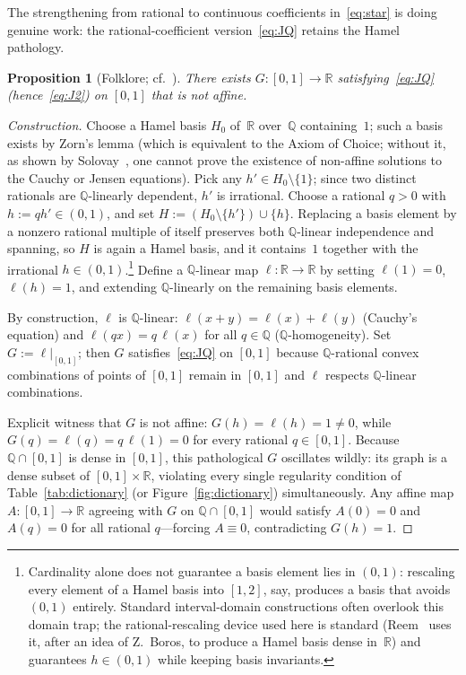 \documentclass{article}
\theoremstyle{plain}
\newtheorem{proposition}[theorem]{Proposition}
\theoremstyle{definition}
\newcommand{\R}{\mathbb{R}}
\newcommand{\Q}{\mathbb{Q}}
\begin{document}
The strengthening from rational to continuous coefficients
in~\eqref{eq:star} is doing genuine work: the rational-coefficient
version~\eqref{eq:JQ} retains the Hamel pathology.

\begin{proposition}[Folklore; cf.~{\cite[\S\S5.2 and~13.2]{Kuczma2009}}]%
\label{prop:JQ-pathology}
There exists $G\colon[0,1]\to\R$ satisfying~\eqref{eq:JQ}
(hence~\eqref{eq:J2}) on $[0,1]$ that is not affine.
\end{proposition}

\begin{proof}[Construction]
Choose a Hamel basis $H_0$ of~$\R$ over~$\Q$ containing~$1$; such a
basis exists by Zorn's lemma (which is equivalent to the Axiom of Choice;
without it, as shown by Solovay~\cite{Solovay1970}, one cannot prove the
existence of non-affine solutions to the Cauchy or Jensen equations).
Pick
any $h'\in H_0\setminus\{1\}$; since two distinct rationals are
$\Q$-linearly dependent, $h'$ is irrational. Choose a rational $q>0$
with $h:=qh'\in(0,1)$, and set $H:=(H_0\setminus\{h'\})\cup\{h\}$.
Replacing a basis element by a nonzero rational multiple of itself
preserves both $\Q$-linear independence and spanning, so $H$ is again
a Hamel basis, and it contains~$1$ together with the irrational
$h\in(0,1)$.\footnote{Cardinality alone does not guarantee a basis element
lies in $(0,1)$: rescaling every element of a Hamel basis into $[1,2]$, say,
produces a basis that avoids $(0,1)$ entirely. Standard interval-domain
constructions often overlook this domain trap; the rational-rescaling
device used here is standard (Reem~\cite[Remark~3.4]{Reem2017} uses
it, after an idea of Z.~Boros, to produce a Hamel basis dense
in~$\R$) and guarantees $h \in (0,1)$ while keeping basis invariants.} Define a $\Q$-linear map $\ell\colon\R\to\R$ by setting
$\ell(1)=0$, $\ell(h)=1$, and extending $\Q$-linearly on the remaining
basis elements.

By construction, $\ell$ is $\Q$-linear: $\ell(x+y)=\ell(x)+\ell(y)$
(Cauchy's equation) and $\ell(qx)=q\,\ell(x)$ for all $q\in\Q$
($\Q$-homogeneity). Set $G:=\ell|_{[0,1]}$; then $G$
satisfies~\eqref{eq:JQ} on $[0,1]$ because $\Q$-rational convex
combinations of points of $[0,1]$ remain in $[0,1]$ and $\ell$
respects $\Q$-linear combinations.

Explicit witness that $G$ is not affine: $G(h)=\ell(h)=1\ne0$, while
$G(q)=\ell(q)=q\,\ell(1)=0$ for every rational $q\in[0,1]$. Because
$\Q\cap[0,1]$ is dense in $[0,1]$, this pathological $G$ oscillates
wildly: its graph is a dense subset of $[0,1]\times\R$, violating every
single regularity condition of Table~\ref{tab:dictionary} (or Figure~\ref{fig:dictionary})
simultaneously. Any affine map $A\colon[0,1]\to\R$ agreeing with $G$ on
$\Q\cap[0,1]$ would satisfy $A(0)=0$ and $A(q)=0$ for all rational
$q$---forcing $A\equiv0$, contradicting $G(h)=1$.
\end{proof}
\end{document}
